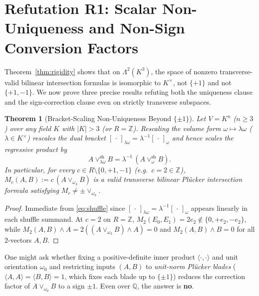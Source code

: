 \documentclass[11pt]{article}
\newtheorem{theorem}{Theorem}[section]
\theoremstyle{definition}
\begin{document}
\section{Refutation R1: Scalar Non-Uniqueness and Non-Sign Conversion Factors}\label{sec:r1}

Theorem~\ref{thm:rigidity} shows that on $\Lambda^2(K^3)$, the space of nonzero transverse-valid bilinear intersection formulas is isomorphic to $K^\times$, not $\{+1\}$ and not $\{+1,-1\}$. We now prove three precise results refuting both the uniqueness clause and the sign-correction clause even on strictly transverse subspaces.

\begin{theorem}[Bracket-Scaling Non-Uniqueness Beyond $\{\pm 1\}$]\label{thm:r1-scale}
Let $V = K^n$ ($n \ge 3$) over any field $K$ with $|K| > 3$ (or $R = \mathbb{Z}$). Rescaling the volume form $\omega \mapsto \lambda\omega$ ($\lambda \in K^\times$) rescales the dual bracket $[\,\cdot\,]_{\lambda\omega} = \lambda^{-1}[\,\cdot\,]_\omega$ and hence scales the regressive product by
\[
  A \vee_{\lambda\omega}^{\mathrm{sh}} B = \lambda^{-1}\,(A \vee_\omega^{\mathrm{sh}} B).
\]
In particular, for every $c \in R \setminus \{0, +1, -1\}$ (e.g.\ $c = 2 \in \mathbb{Z}$), $M_c(A,B) := c\,(A \vee_{\omega_3} B)$ is a valid transverse bilinear Pl\"ucker intersection formula satisfying $M_c \neq \pm \vee_{\omega_3}$.
\end{theorem}
\begin{proof}
Immediate from \eqref{eq:shuffle} since $[\,\cdot\,]_{\lambda\omega} = \lambda^{-1}[\,\cdot\,]_\omega$ appears linearly in each shuffle summand. At $c = 2$ on $R = \mathbb{Z}$, $M_2(E_0, E_1) = 2 e_2 \notin \{0, +e_2, -e_2\}$, while $M_2(A, B) \wedge A = 2((A \vee_{\omega_3} B) \wedge A) = 0$ and $M_2(A, B) \wedge B = 0$ for all $2$-vectors $A, B$.
\end{proof}

One might ask whether fixing a positive-definite inner product $\langle \cdot, \cdot \rangle$ and unit orientation $\omega_0$ and restricting inputs $(A, B)$ to \emph{unit-norm Pl\"ucker blades} ($\langle A, A \rangle = \langle B, B \rangle = 1$, which fixes each blade up to $\{\pm 1\}$) reduces the correction factor of $A \vee_{\omega_0} B$ to a sign $\pm 1$. Even over $\mathbb{Q}$, the answer is \textbf{no}.
\end{document}
